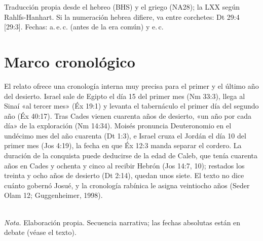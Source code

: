 \documentclass[11pt,letterpaper]{article}
\begin{document}
\begin{nota}
Traducción propia desde el hebreo (BHS) y el griego (NA28); la LXX según Rahlfs-Hanhart. Si la numeración hebrea difiere, va entre corchetes: Dt 29:4 [29:3]. Fechas: a.\,e.\,c. (antes de la era común) y e.\,c.
\end{nota}

\section{Marco cronológico}

El relato ofrece una cronología interna muy precisa para el primer y el último año del desierto. Israel sale de Egipto el día 15 del primer mes (Nm 33:3), llega al Sinaí «al tercer mes» (Éx 19:1) y levanta el tabernáculo el primer día del segundo año (Éx 40:17). Tras Cades vienen cuarenta años de desierto, «un año por cada día» de la exploración (Nm 14:34). Moisés pronuncia Deuteronomio en el undécimo mes del año cuarenta (Dt 1:3), e Israel cruza el Jordán el día 10 del primer mes (Jos 4:19), la fecha en que Éx 12:3 manda separar el cordero. La duración de la conquista puede deducirse de la edad de Caleb, que tenía cuarenta años en Cades y ochenta y cinco al recibir Hebrón (Jos 14:7, 10); restados los treinta y ocho años de desierto (Dt 2:14), quedan unos siete. El texto no dice cuánto gobernó Josué, y la cronología rabínica le asigna veintiocho años (Seder Olam 12; Guggenheimer, 1998).

\begin{center}
\\[2pt]
{\footnotesize\color{sepia}\textit{Nota.} Elaboración propia. Secuencia narrativa; las fechas absolutas están en debate (véase el texto).}
\end{center}
\end{document}
